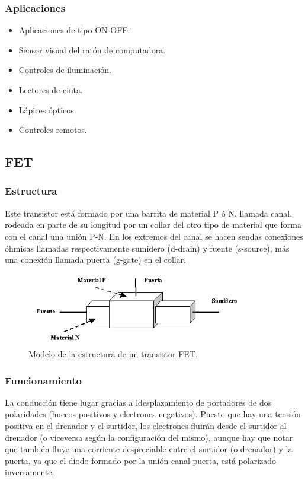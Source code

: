 \documentclass[letterpaper, 12pt]{article}
\begin{document}
\begin{justify}
        \subsubsection{Aplicaciones}
        \begin{itemize}
            \item Aplicaciones de tipo ON-OFF.
            \item Sensor visual del ratón de computadora.
            \item Controles de iluminación.
            \item Lectores de cinta.
            \item Lápices ópticos
            \item Controles remotos.
        \end{itemize}
        \subsection{FET}
        \subsubsection{Estructura}
        Este transistor está formado por una barrita de material P ó N. llamada canal, rodeada en parte de su longitud por un collar del otro tipo de material que forma con el canal una unión P-N.
        En los extremos del canal se hacen sendas conexiones óhmicas llamadas respectivamente sumidero (d-drain) y fuente (s-source), más una conexión llamada puerta (g-gate) en el collar.
        \begin{figure}
            \centering
            \includegraphics[width=10cm]{FET.jpg}
            \caption{Modelo de la estructura de un transistor FET.}
            \label{fig:FET}
        \end{figure}
        \subsubsection{Funcionamiento}
        La conducción tiene lugar gracias a ldesplazamiento de portadores de dos polaridades (huecos positivos y electrones negativos). Puesto que hay una tensión positiva en el drenador y el surtidor, los electrones fluirán desde el surtidor al drenador
        (o viceversa según la configuración del mismo), aunque hay que notar que también fluye una corriente despreciable entre el surtidor (o drenador) y la puerta, ya que el diodo formado por la unión canal-puerta, está polarizado inversamente.

\end{justify}
\end{document}
